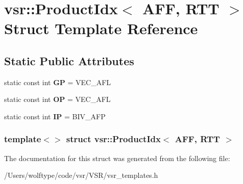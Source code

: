 \hypertarget{structvsr_1_1_product_idx_3_01_a_f_f_00_01_r_t_t_01_4}{\section{vsr\-:\-:Product\-Idx$<$ A\-F\-F, R\-T\-T $>$ Struct Template Reference}
\label{structvsr_1_1_product_idx_3_01_a_f_f_00_01_r_t_t_01_4}
}
\subsection*{Static Public Attributes}
\begin{DoxyCompactItemize}
\item 
\hypertarget{structvsr_1_1_product_idx_3_01_a_f_f_00_01_r_t_t_01_4_ab56dce0b7a2a608cba06f477f30a3e38}{static const int {\bfseries G\-P} = V\-E\-C\-\_\-\-A\-F\-L}\label{structvsr_1_1_product_idx_3_01_a_f_f_00_01_r_t_t_01_4_ab56dce0b7a2a608cba06f477f30a3e38}

\item 
\hypertarget{structvsr_1_1_product_idx_3_01_a_f_f_00_01_r_t_t_01_4_a2b222a5b0fe6133c711d2f155e2958d3}{static const int {\bfseries O\-P} = V\-E\-C\-\_\-\-A\-F\-L}\label{structvsr_1_1_product_idx_3_01_a_f_f_00_01_r_t_t_01_4_a2b222a5b0fe6133c711d2f155e2958d3}

\item 
\hypertarget{structvsr_1_1_product_idx_3_01_a_f_f_00_01_r_t_t_01_4_aec7c3f9170993dd8ab4e91369597e61b}{static const int {\bfseries I\-P} = B\-I\-V\-\_\-\-A\-F\-P}\label{structvsr_1_1_product_idx_3_01_a_f_f_00_01_r_t_t_01_4_aec7c3f9170993dd8ab4e91369597e61b}

\end{DoxyCompactItemize}
\subsubsection*{template$<$$>$ struct vsr\-::\-Product\-Idx$<$ A\-F\-F, R\-T\-T $>$}



The documentation for this struct was generated from the following file\-:\begin{DoxyCompactItemize}
\item 
/\-Users/wolftype/code/vsr/\-V\-S\-R/vsr\-\_\-templates.\-h\end{DoxyCompactItemize}

